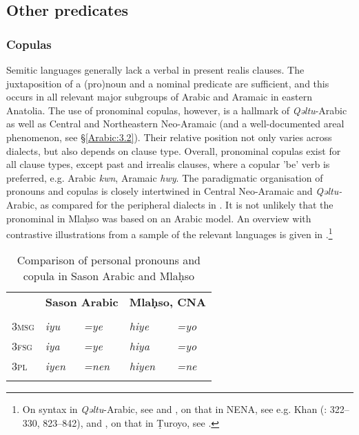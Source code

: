 \documentclass[output=paper,colorlinks,citecolor=brown,draftmode]{langscibook}
\begin{document}
\subsection{Other predicates}

\subsubsection{Copulas}\label{Arabic:2.3.1}

Semitic languages generally lack a verbal  in present realis clauses. The juxtaposition of a (pro)noun and a nominal predicate are sufficient, and this occurs in all relevant major subgroups of Arabic and Aramaic in eastern Anatolia. The use of pronominal copulas, however, is a hallmark of \textit{Qəltu}-Arabic as well as Central and Northeastern Neo-Aramaic (and a well-documented areal phenomenon, see §\ref{Arabic:3.2}). Their relative position not only varies across dialects, but also depends on clause type. Overall, pronominal copulas exist for all clause types, except past and irrealis clauses, where a copular 'be' verb is preferred, e.g. Arabic \textit{kwn}, Aramaic \textit{hwy}. The paradigmatic organisation of pronouns and copulas is closely intertwined in Central Neo-Aramaic and \textit{Qəltu-}Arabic, as compared for the peripheral dialects in . It is not unlikely that the pronominal  in Mlaḥso was based on an Arabic model. An overview with contrastive illustrations from a sample of the relevant languages is given in .\footnote{On  syntax in \textit{Qəltu}-Arabic, see \citet[131--141]{Jastrow1978MAqetlu1} and \citet[204--218]{Birnstiel2022CopulaKA}, on that in NENA, see e.g. Khan (\citeyear{Khan2002Qaraqosh}: 322–330, \citeyear{Khan2008JUrmi} 823–842), \citet[30--65]{Cohen2012NENAZaxo} and \citet[140--174]{Molin2024JDuhok}, on that in Ṭuroyo, see \citet[112–122, 208–210, 238–240]{Waltisberg2016STuroyo}.}

\begin{table}
    \begin{tabularx}{.8\textwidth}{XXXXl}
\lsptoprule
& \multicolumn{2}{l}{\textbf{Sason Arabic}} & \multicolumn{2}{l}{\textbf{Mlaḥso, CNA}} \\
& \multicolumn{2}{l}{\citep[14]{Akkus2017PArabic}} & \multicolumn{2}{l}{\citep{Jastrow1988NAHertevin}} \\
\midrule
\textsc{3msg} & \textit{iyu} & \textit{=ye} & \textit{hiye} & \textit{=yo} \\
\textsc{3fsg} & \textit{iya} & \textit{=ye} & \textit{hiya} & \textit{=yo} \\
\textsc{3pl} & \textit{iyen} & \textit{=nen} & \textit{hiyen} & \textit{=ne} \\
\lspbottomrule
    \end{tabularx}
    \caption{Comparison of personal pronouns and copula in Sason Arabic and Mlaḥso}
    \label{Arabic:tab:4}
\end{table}
\end{document}

